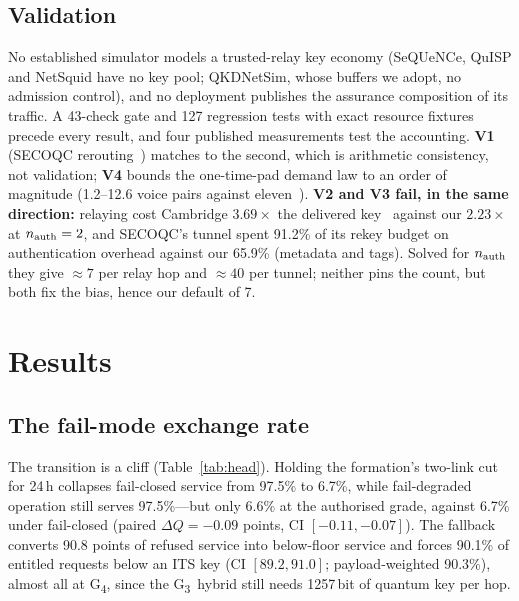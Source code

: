 \documentclass[conference,a4paper]{IEEEtran}
\newcommand{\GIII}{G\textsubscript{3}}
\newcommand{\GIV}{G\textsubscript{4}}
\begin{document}
\subsection{Validation}\label{sec:valid}
No established simulator models a trusted-relay key economy (SeQUeNCe, QuISP and
NetSquid have no key pool; QKDNetSim, whose buffers we adopt, no admission
control), and no deployment publishes the assurance composition of its traffic. A
43-check gate and 127 regression tests with exact resource fixtures precede every
result, and four published measurements test the accounting. \textbf{V1} (SECOQC
rerouting~\cite{peev}) matches to the second, which is arithmetic consistency,
not validation; \textbf{V4} bounds the one-time-pad demand law to an order of
magnitude (1.2--12.6 voice pairs against eleven~\cite{chen}). \textbf{V2 and V3 fail,
in the same direction:} relaying cost Cambridge $3.69\times$ the delivered
key~\cite{dynes} against our $2.23\times$ at $n_{\rm auth}=2$, and SECOQC's tunnel
spent 91.2\% of its rekey budget on authentication overhead against our 65.9\% (metadata and tags). Solved for
$n_{\rm auth}$ they give $\approx7$ per relay hop and $\approx40$ per tunnel; neither
pins the count, but both fix the bias, hence our default of 7.

\section{Results}
\subsection{The fail-mode exchange rate}\label{sec:head}
\begin{table}[t]
\caption{Formation under a 24\,h generation attack ($\Delta e=0.05$) from 2\% usable
fill, twelve seeds. $b$: budget in relative cost; cut: cut links first ($b=2$ is the cut); betw.: static-betweenness adversary. $A$, $Q$,
class $Q$: \% of arrivals; $F$: \% of entitled arrivals; \GIV: \% of served sessions.
95\% bootstrap half-widths ${\le}1.0$ point and seed SDs ${\le}1.8$, except
$Q_{\mathrm{ISR}}$ (3.1 and 5.6; ${\approx}175$ ISR arrivals per seed).}
\label{tab:head}
\centering\footnotesize
\setlength{\tabcolsep}{2.2pt}

\end{table}

The transition is a cliff (Table~\ref{tab:head}). Holding the formation's two-link
cut for 24\,h collapses fail-closed service from 97.5\% to 6.7\%, while
fail-degraded operation still serves 97.5\%---but only 6.6\% at the authorised
grade, against 6.7\% under fail-closed (paired $\Delta Q=-0.09$ points, CI
$[-0.11,-0.07]$). The fallback converts 90.8 points of refused service into below-floor service and forces 90.1\% of entitled
requests below an ITS key (CI $[89.2,91.0]$; payload-weighted 90.3\%), almost all
at \GIV, since the \GIII\ hybrid still needs 1257\,bit of quantum key per hop.
\end{document}
